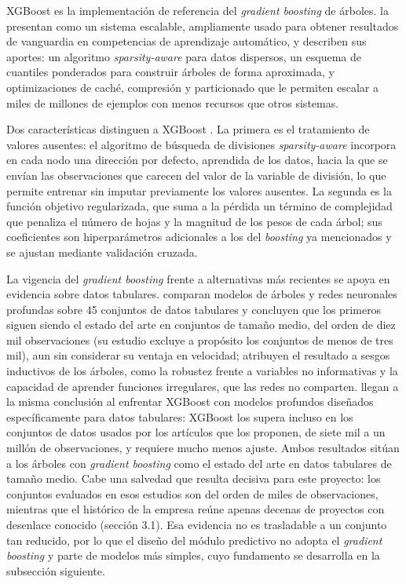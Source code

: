 XGBoost es la implementación de referencia del \textit{gradient boosting} de árboles. \textcite{Chen2016} la presentan como un sistema escalable, ampliamente usado para obtener resultados de vanguardia en competencias de aprendizaje automático, y describen sus aportes: un algoritmo \textit{sparsity-aware} para datos dispersos, un esquema de cuantiles ponderados para construir árboles de forma aproximada, y optimizaciones de caché, compresión y particionado que le permiten escalar a miles de millones de ejemplos con menos recursos que otros sistemas.

Dos características distinguen a XGBoost \parencite{Chen2016}. La primera es el tratamiento de valores ausentes: el algoritmo de búsqueda de divisiones \textit{sparsity-aware} incorpora en cada nodo una dirección por defecto, aprendida de los datos, hacia la que se envían las observaciones que carecen del valor de la variable de división, lo que permite entrenar sin imputar previamente los valores ausentes. La segunda es la función objetivo regularizada, que suma a la pérdida un término de complejidad que penaliza el número de hojas y la magnitud de los pesos de cada árbol; sus coeficientes son hiperparámetros adicionales a los del \textit{boosting} ya mencionados y se ajustan mediante validación cruzada.

La vigencia del \textit{gradient boosting} frente a alternativas más recientes se apoya en evidencia sobre datos tabulares. \textcite{Grinsztajn2022} comparan modelos de árboles y redes neuronales profundas sobre 45 conjuntos de datos tabulares y concluyen que los primeros siguen siendo el estado del arte en conjuntos de tamaño medio, del orden de diez mil observaciones (su estudio excluye a propósito los conjuntos de menos de tres mil), aun sin considerar su ventaja en velocidad; atribuyen el resultado a sesgos inductivos de los árboles, como la robustez frente a variables no informativas y la capacidad de aprender funciones irregulares, que las redes no comparten. \textcite{ShwartzZiv2022} llegan a la misma conclusión al enfrentar XGBoost con modelos profundos diseñados específicamente para datos tabulares: XGBoost los supera incluso en los conjuntos de datos usados por los artículos que los proponen, de siete mil a un millón de observaciones, y requiere mucho menos ajuste. Ambos resultados sitúan a los árboles con \textit{gradient boosting} como el estado del arte en datos tabulares de tamaño medio. Cabe una salvedad que resulta decisiva para este proyecto: los conjuntos evaluados en esos estudios son del orden de miles de observaciones, mientras que el histórico de la empresa reúne apenas decenas de proyectos con desenlace conocido (sección 3.1). Esa evidencia no es trasladable a un conjunto tan reducido, por lo que el diseño del módulo predictivo no adopta el \textit{gradient boosting} y parte de modelos más simples, cuyo fundamento se desarrolla en la subsección siguiente.

